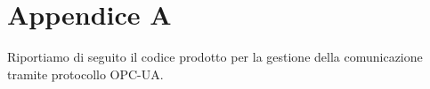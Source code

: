 \chapter{Appendice A}
\label{cod:Appendice_opcua}
Riportiamo di seguito il codice prodotto per la gestione della comunicazione tramite protocollo OPC-UA.

